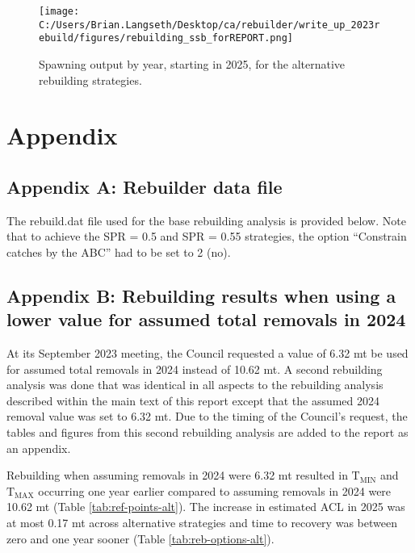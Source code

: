 \documentclass[11pt,
  letterpaper,
]{article}
\begin{document}
\begin{figure}
\centering
\texttt{[image: C:/Users/Brian.Langseth/Desktop/ca/rebuilder/write\_up\_2023rebuild/figures/rebuilding\_ssb\_forREPORT.png]}
\caption{Spawning output by year, starting in 2025, for the alternative rebuilding strategies.\label{fig:ssb-fig}}
\end{figure}

\clearpage

\clearpage

\hypertarget{appendix}{%
\section{Appendix}\label{appendix}}

\hypertarget{append_a}{%
\subsection{Appendix A: Rebuilder data file}\label{append_a}}

The rebuild.dat file used for the base rebuilding analysis is provided below. Note that to achieve the SPR = 0.5 and SPR = 0.55 strategies, the option ``Constrain catches by the ABC'' had to be set to 2 (no).

\clearpage

\hypertarget{append_b}{%
\subsection{Appendix B: Rebuilding results when using a lower value for assumed total removals in 2024}\label{append_b}}

At its September 2023 meeting, the Council requested a value of 6.32 mt be used for assumed total removals in 2024 instead of 10.62 mt. A second rebuilding analysis was done that was identical in all aspects to the rebuilding analysis described within the main text of this report except that the assumed 2024 removal value was set to 6.32 mt. Due to the timing of the Council's request, the tables and figures from this second rebuilding analysis are added to the report as an appendix.

Rebuilding when assuming removals in 2024 were 6.32 mt resulted in \(\text{T}_\text{MIN}\) and \(\text{T}_\text{MAX}\) occurring one year earlier compared to assuming removals in 2024 were 10.62 mt (Table \ref{tab:ref-points-alt}). The increase in estimated ACL in 2025 was at most 0.17 mt across alternative strategies and time to recovery was between zero and one year sooner (Table \ref{tab:reb-options-alt}).
\end{document}
